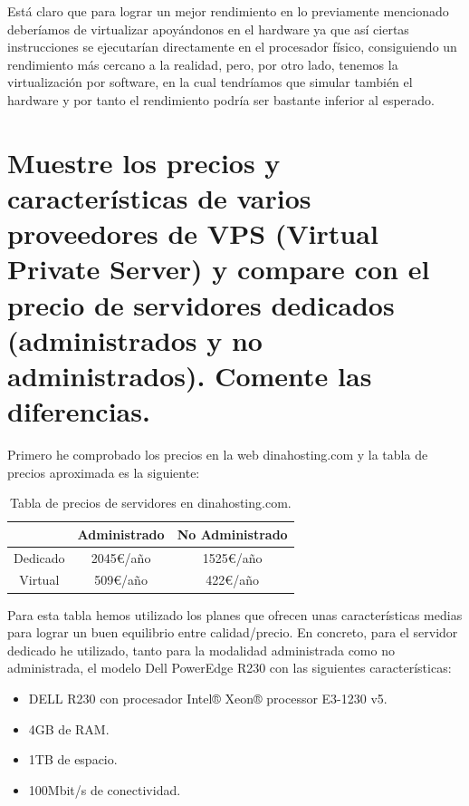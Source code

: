 Está claro que para lograr un mejor rendimiento en lo previamente mencionado deberíamos de virtualizar apoyándonos en el hardware ya que así ciertas instrucciones se ejecutarían directamente en el procesador físico, consiguiendo un rendimiento más cercano a la realidad, pero, por otro lado, tenemos la virtualización por software, en la cual tendríamos que simular también el hardware y por tanto el rendimiento podría ser bastante inferior al esperado.




\section{Muestre los precios y características de varios proveedores de VPS (Virtual Private Server) y compare con el precio de servidores dedicados (administrados y no administrados). Comente las diferencias.}
Primero he comprobado los precios en la web dinahosting.com \cite{dinahosting} y la tabla de precios aproximada es la siguiente:

\begin{table}[H]
	\centering
	\begin{tabular}{|c|c|c|}
		\hline
		\textbf{ } & \textbf{Administrado} & \textbf{No Administrado} \\
		\hline
		Dedicado & 2045€/año & 1525€/año \\
		Virtual & 509€/año & 422€/año \\
		\hline
	\end{tabular}  
	\caption{Tabla de precios de servidores en dinahosting.com.} \label{tab:tablasencilla}
\end{table}

Para esta tabla hemos utilizado los planes que ofrecen unas características medias para lograr un buen equilibrio entre calidad/precio. En concreto, para el servidor dedicado he utilizado, tanto para la modalidad administrada como no administrada, el modelo Dell PowerEdge R230 con las siguientes características:
\begin{itemize}
	\item DELL R230 con procesador Intel® Xeon® processor E3-1230 v5.
	\item 4GB de RAM.
	\item 1TB de espacio.
	\item 100Mbit/s de conectividad.
\end{itemize}


